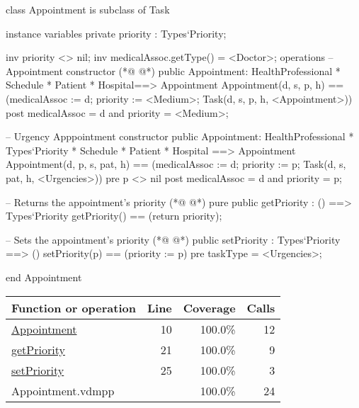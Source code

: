 \begin{vdmpp}[breaklines=true]
class Appointment is subclass of Task

instance variables
  private priority : Types`Priority;
  
  inv priority <> nil;
  inv medicalAssoc.getType() = <Doctor>;
operations
 -- Appointment constructor
(*@
\label{Appointment:10}
@*)
 public Appointment: HealthProfessional * Schedule * Patient * Hospital==> Appointment
  Appointment(d, s, p, h) == (medicalAssoc := d; priority := <Medium>; Task(d, s, p, h, <Appointment>))
 post medicalAssoc = d and priority = <Medium>;
 
 -- Urgency Apppointment constructor
 public Appointment: HealthProfessional * Types`Priority * Schedule * Patient * Hospital ==> Appointment
  Appointment(d, p, s, pat, h) == (medicalAssoc := d; priority := p; Task(d, s, pat, h, <Urgencies>))
 pre p <> nil
 post medicalAssoc = d and priority = p;

 -- Returns the appointment's priority
(*@
\label{getPriority:21}
@*)
 pure public getPriority : () ==> Types`Priority
  getPriority() == (return priority);

  -- Sets the appointment's priority
(*@
\label{setPriority:25}
@*)
  public setPriority : Types`Priority ==> ()
   setPriority(p) == (priority := p)
  pre taskType = <Urgencies>;
  
end Appointment
\end{vdmpp}
\bigskip
\begin{longtable}{|l|r|r|r|}
\hline
Function or operation & Line & Coverage & Calls \\
\hline
\hline
\hyperref[Appointment:10]{Appointment} & 10&100.0\% & 12 \\
\hline
\hyperref[getPriority:21]{getPriority} & 21&100.0\% & 9 \\
\hline
\hyperref[setPriority:25]{setPriority} & 25&100.0\% & 3 \\
\hline
\hline
Appointment.vdmpp & & 100.0\% & 24 \\
\hline
\end{longtable}

